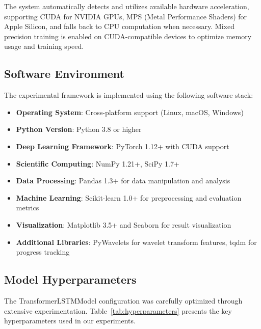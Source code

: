 The system automatically detects and utilizes available hardware acceleration, supporting CUDA for NVIDIA GPUs, MPS (Metal Performance Shaders) for Apple Silicon, and falls back to CPU computation when necessary. Mixed precision training is enabled on CUDA-compatible devices to optimize memory usage and training speed.

\subsection{Software Environment}
\label{subsec:software_environment}

The experimental framework is implemented using the following software stack:

\begin{itemize}
    \item \textbf{Operating System}: Cross-platform support (Linux, macOS, Windows)
    \item \textbf{Python Version}: Python 3.8 or higher
    \item \textbf{Deep Learning Framework}: PyTorch 1.12+ with CUDA support
    \item \textbf{Scientific Computing}: NumPy 1.21+, SciPy 1.7+
    \item \textbf{Data Processing}: Pandas 1.3+ for data manipulation and analysis
    \item \textbf{Machine Learning}: Scikit-learn 1.0+ for preprocessing and evaluation metrics
    \item \textbf{Visualization}: Matplotlib 3.5+ and Seaborn for result visualization
    \item \textbf{Additional Libraries}: PyWavelets for wavelet transform features, tqdm for progress tracking
\end{itemize}

\subsection{Model Hyperparameters}
\label{subsec:model_hyperparameters}

The TransformerLSTMModel configuration was carefully optimized through extensive experimentation. Table~\ref{tab:hyperparameters} presents the key hyperparameters used in our experiments.

